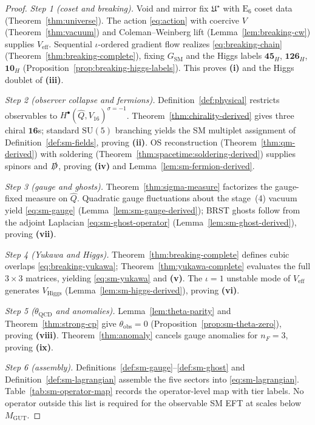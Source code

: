 \documentclass[aps,prd,onecolumn,amsmath,amssymb,nofootinbib,11pt]{revtex4-2}
\numberwithin{equation}{section}
\theoremstyle{plain}
\theoremstyle{definition}
\theoremstyle{remark}
\newcommand{\E}[1]{\mathrm{E}_{#1}}
\begin{document}
\begin{proof}
\emph{Step 1 (coset and breaking).}
Void and mirror fix $\mathfrak{U}^\star$ with $\E{6}$ coset data
(Theorem~\ref{thm:universe}). The action \eqref{eq:action} with coercive
$V$ (Theorem~\ref{thm:vacuum}) and Coleman--Weinberg lift
(Lemma~\ref{lem:breaking-cw}) supplies $V_{\mathrm{eff}}$. Sequential
$\iota$-ordered gradient flow realizes \eqref{eq:breaking-chain}
(Theorem~\ref{thm:breaking-complete}), fixing $G_{\mathrm{SM}}$ and the Higgs
labels $\mathbf{45}_H$, $\mathbf{126}_H$, $\mathbf{10}_H$
(Proposition~\ref{prop:breaking-higgs-labels}). This proves
\textbf{(i)} and the Higgs doublet of \textbf{(iii)}.

\emph{Step 2 (observer collapse and fermions).}
Definition~\ref{def:physical} restricts observables to
$H^\bullet(\hat Q,V_{16})^{\sigma=-1}$. Theorem~\ref{thm:chirality-derived}
gives three chiral $\mathbf{16}$s; standard $\mathrm{SU}(5)$ branching yields
the SM multiplet assignment of Definition~\ref{def:sm-fields}, proving
\textbf{(ii)}. OS reconstruction (Theorem~\ref{thm:qm-derived}) with soldering
(Theorem~\ref{thm:spacetime:soldering-derived}) supplies spinors and
$\slashed{D}$, proving \textbf{(iv)} and Lemma~\ref{lem:sm-fermion-derived}.

\emph{Step 3 (gauge and ghosts).}
Theorem~\ref{thm:sigma-measure} factorizes the gauge-fixed measure on
$\hat Q$. Quadratic gauge fluctuations about the stage~(4) vacuum yield
\eqref{eq:sm-gauge} (Lemma~\ref{lem:sm-gauge-derived}); BRST ghosts follow
from the adjoint Laplacian \eqref{eq:sm-ghost-operator}
(Lemma~\ref{lem:sm-ghost-derived}), proving \textbf{(vii)}.

\emph{Step 4 (Yukawa and Higgs).}
Theorem~\ref{thm:breaking-complete} defines cubic overlaps
\eqref{eq:breaking-yukawa}; Theorem~\ref{thm:yukawa-complete} evaluates the
full $3\times3$ matrices, yielding \eqref{eq:sm-yukawa} and \textbf{(v)}.
The $\iota=1$ unstable mode of $V_{\mathrm{eff}}$ generates
$V_{\mathrm{Higgs}}$ (Lemma~\ref{lem:sm-higgs-derived}), proving
\textbf{(vi)}.

\emph{Step 5 ($\theta_{\mathrm{QCD}}$ and anomalies).}
Lemma~\ref{lem:theta-parity} and Theorem~\ref{thm:strong-cp} give
$\theta_{\mathrm{obs}}=0$ (Proposition~\ref{prop:sm-theta-zero}), proving
\textbf{(viii)}. Theorem~\ref{thm:anomaly} cancels gauge anomalies for
$n_F=3$, proving \textbf{(ix)}.

\emph{Step 6 (assembly).}
Definitions~\ref{def:sm-gauge}--\ref{def:sm-ghost} and
Definition~\ref{def:sm-lagrangian} assemble the five sectors into
\eqref{eq:sm-lagrangian}. Table~\ref{tab:sm-operator-map} records the
operator-level map with tier labels. No operator outside this list is required
for the observable SM EFT at scales below $M_{\mathrm{GUT}}$.
\end{proof}
\end{document}
